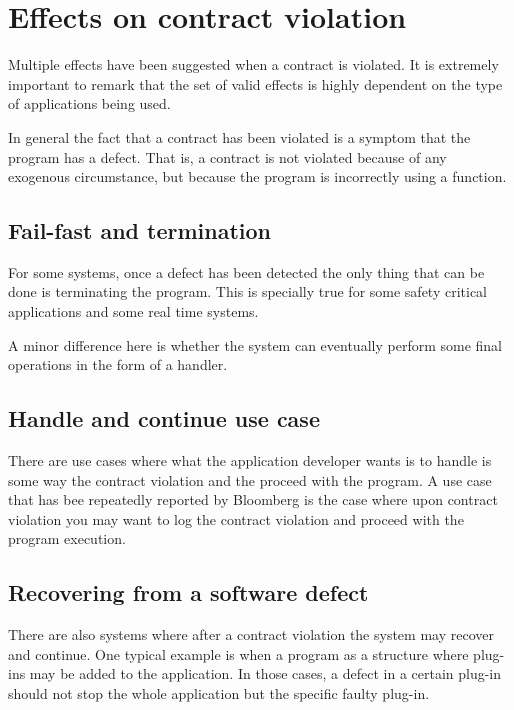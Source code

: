 \section{Effects on contract violation}

Multiple effects have been suggested when a contract is violated. It is extremely
important to remark that the set of valid effects is highly dependent on the type
of applications being used.

In general the fact that a contract has been violated is a symptom that the
program has a defect. That is, a contract is not violated because of any
exogenous circumstance, but because the program is incorrectly using a function.

\subsection{Fail-fast and termination}

For some systems, once a defect has been detected the only thing that can be
done is terminating the program. This is specially true for some safety critical
applications and some real time systems.

A minor difference here is whether the system can eventually perform some final
operations in the form of a  handler.

\subsection{Handle and continue use case}

There are use cases where what the application developer wants is to handle is
some way the contract violation and the proceed with the program. A use case
that has bee repeatedly reported by Bloomberg is the case where upon contract
violation you may want to log the contract violation and proceed with the
program execution.

\subsection{Recovering from a software defect}

There are also systems where after a contract violation the system may recover
and continue. One typical example is when a program as a structure where
plug-ins may be added to the application. In those cases, a defect in a certain
plug-in should not stop the whole application but the specific faulty plug-in.

